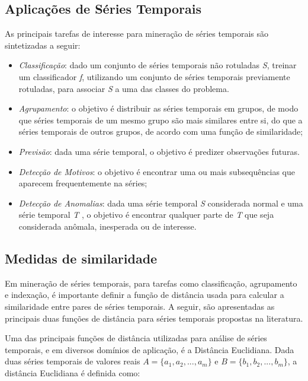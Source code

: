 \subsection{Aplicações de Séries Temporais}
As principais tarefas de interesse para mineração de séries temporais são sintetizadas a seguir\cite{Maimon:2005:DMK:1088958}:

\begin{itemize}
	\item \textit{Classificação}: dado um conjunto de séries temporais não rotuladas \textit{S}, treinar um classificador \textit{f}, utilizando um conjunto de séries temporais previamente rotuladas, para associar \textit{S} a uma das classes do problema.	
	\item \textit{Agrupamento}: o objetivo é distribuir as séries temporais em grupos, de modo que séries temporais de um mesmo grupo são mais similares entre si, do que  a séries temporais de  outros grupos, de acordo com uma função de similaridade; 
	\item \textit{Previsão}: dada uma série temporal, o objetivo é predizer observações futuras.
	\item \textit{Detecção de Motivos}: o objetivo é encontrar uma ou mais subsequências que aparecem frequentemente na séries;
	\item \textit{Detecção de Anomalias}: dada uma série temporal \textit{S} considerada normal e uma série temporal \textit{T} , o objetivo é encontrar qualquer parte de \textit{T} que seja considerada anômala, inesperada ou de interesse.
\end{itemize}

\subsection{Medidas de similaridade} \label{diss}

Em mineração de séries temporais, para tarefas como classificação, agrupamento e indexação, é importante definir a função de distância usada para calcular a similaridade entre pares de séries temporais. A seguir, são apresentadas as principais duas funções de distância para séries temporais propostas na literatura.

Uma das principais funções de distância utilizadas para análise de séries temporais, e em diversos domínios de aplicação, é a Distância Euclidiana. Dada duas séries temporais de valores reais $A = \{a_1,a_2,...,a_m \}$ e $B = \{b_1,b_2,...,b_m \}$, a distância Euclidiana é definida como:

